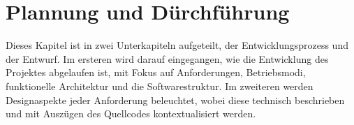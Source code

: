 \chapter{Plannung und Dürchführung} \label{plannung_durchfuhrung}
Dieses Kapitel ist in zwei Unterkapiteln aufgeteilt, der Entwicklungsprozess und der Entwurf. Im ersteren wird darauf eingegangen, wie die Entwicklung des Projektes abgelaufen ist, mit Fokus auf Anforderungen, Betriebsmodi, funktionelle Architektur und die Softwarestruktur. Im zweiteren werden Designaspekte jeder Anforderung beleuchtet, wobei diese technisch beschrieben und mit Auszügen des Quellcodes kontextualisiert werden.  



